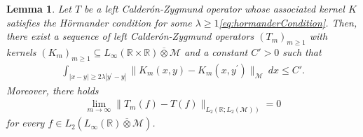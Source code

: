 \documentclass[10pt,a4paper]{amsart}
\newtheorem{lemma}{Lemma}
\newcommand{\Avnat}{\Linfty(\mathbb{R}) \overline{\otimes} \mathcal{M}}
\newcommand{\Linfty}{L_\infty}
\newcommand{\Ltwo}{L_2}
\begin{document}
    \begin{lemma}\label{lem:approxKernel}
      Let $T$ be a left Calder\'on-Zygmund operator whose associated
      kernel $K$ satisfies the Hörmander condition  for some $\lambda \geq 1$\eqref{eq:hormanderCondition}. Then, there exist a sequence of left Calder\'on-Zygmund operators $(T_m)_{m\geq 1}$ with
      kernels
      $(K_m)_{m \geq 1} \subseteq \Linfty(\mathbb{R} \times
      \mathbb{R}) \overline{\otimes} \mathcal{M}$ and a constant
      $C'>0$ such that
        \begin{align}\label{eq:weakerHormander}
            \int_{|x-y| \geq 2\lambda |y^\prime-y|} \|K_m(x,y) - K_m(x,y^\prime)\|_{\mathcal{M}} \ dx \leq C'.
        \end{align}
         Moreover, there holds
            \begin{align*}
                \lim_{m \rightarrow \infty} \|T_m(f) - T(f) \|_{\Ltwo(\mathbb{R};\Ltwo(\mathcal{M}))} = 0
            \end{align*}
            for every $f \in \Ltwo(\Avnat)$.
    \end{lemma}
\end{document}
